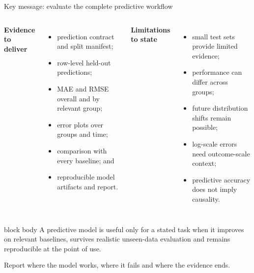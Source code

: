 \documentclass[10pt,aspectratio=169]{beamer}
\begin{document}
\begin{frame}{Key message: evaluate the complete predictive workflow}

\small

\begin{columns}[T]


\textbf{Evidence to deliver}

\begin{itemize}
  \item prediction contract and split manifest;
  \item row-level held-out predictions;
  \item MAE and RMSE overall and by relevant group;
  \item error plots over groups and time;
  \item comparison with every baseline; and
  \item reproducible model artifacts and report.
\end{itemize}


\textbf{Limitations to state}

\begin{itemize}
  \item small test sets provide limited evidence;
  \item performance can differ across groups;
  \item future distribution shifts remain possible;
  \item log-scale errors need outcome-scale context;
  \item predictive accuracy does not imply causality.
\end{itemize}

\end{columns}

\vspace{0.30cm}

\begin{beamercolorbox}[rounded=true,sep=8pt]{block body}
A predictive model is useful only for a stated task when it improves on relevant baselines, survives realistic unseen-data evaluation and remains reproducible at the point of use.
\end{beamercolorbox}

\vspace{0.15cm}

\centering
\textcolor{ukudlaRed}{Report where the model works, where it fails and where the evidence ends.}

\end{frame}
\end{document}
